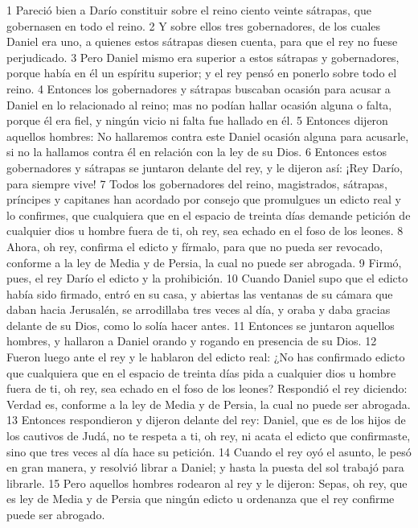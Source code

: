 1 Pareció bien a Darío constituir sobre el reino ciento veinte sátrapas, que gobernasen en todo el reino.
2 Y sobre ellos tres gobernadores, de los cuales Daniel era uno, a quienes estos sátrapas diesen cuenta, para que el rey no fuese perjudicado.
3 Pero Daniel mismo era superior a estos sátrapas y gobernadores, porque había en él un espíritu superior; y el rey pensó en ponerlo sobre todo el reino.
4 Entonces los gobernadores y sátrapas buscaban ocasión para acusar a Daniel en lo relacionado al reino; mas no podían hallar ocasión alguna o falta, porque él era fiel, y ningún vicio ni falta fue hallado en él.
5 Entonces dijeron aquellos hombres: No hallaremos contra este Daniel ocasión alguna para acusarle, si no la hallamos contra él en relación con la ley de su Dios.
6 Entonces estos gobernadores y sátrapas se juntaron delante del rey, y le dijeron así: ¡Rey Darío, para siempre vive!
7 Todos los gobernadores del reino, magistrados, sátrapas, príncipes y capitanes han acordado por consejo que promulgues un edicto real y lo confirmes, que cualquiera que en el espacio de treinta días demande petición de cualquier dios u hombre fuera de ti, oh rey, sea echado en el foso de los leones.
8 Ahora, oh rey, confirma el edicto y fírmalo, para que no pueda ser revocado, conforme a la ley de Media y de Persia, la cual no puede ser abrogada.
9 Firmó, pues, el rey Darío el edicto y la prohibición.
10 Cuando Daniel supo que el edicto había sido firmado, entró en su casa, y abiertas las ventanas de su cámara que daban hacia Jerusalén, se arrodillaba tres veces al día, y oraba y daba gracias delante de su Dios, como lo solía hacer antes.
11 Entonces se juntaron aquellos hombres, y hallaron a Daniel orando y rogando en presencia de su Dios.
12 Fueron luego ante el rey y le hablaron del edicto real: ¿No has confirmado edicto que cualquiera que en el espacio de treinta días pida a cualquier dios u hombre fuera de ti, oh rey, sea echado en el foso de los leones? Respondió el rey diciendo: Verdad es, conforme a la ley de Media y de Persia, la cual no puede ser abrogada.
13 Entonces respondieron y dijeron delante del rey: Daniel, que es de los hijos de los cautivos de Judá, no te respeta a ti, oh rey, ni acata el edicto que confirmaste, sino que tres veces al día hace su petición.
14 Cuando el rey oyó el asunto, le pesó en gran manera, y resolvió librar a Daniel; y hasta la puesta del sol trabajó para librarle.
15 Pero aquellos hombres rodearon al rey y le dijeron: Sepas, oh rey, que es ley de Media y de Persia que ningún edicto u ordenanza que el rey confirme puede ser abrogado.
